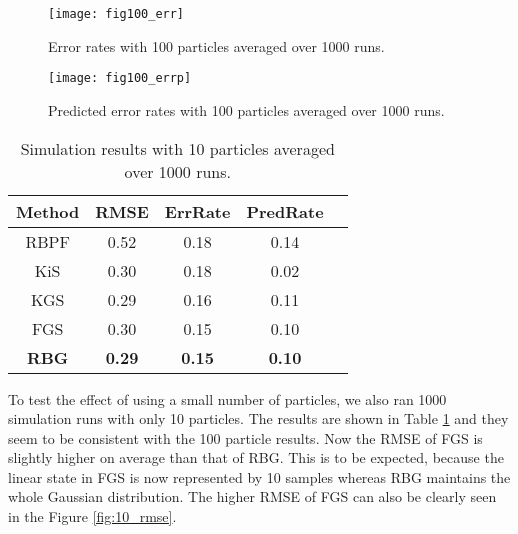 \documentclass[twocolumn]{autart}    %
\begin{document}
\begin{figure}[htb!]
\begin{center}
\texttt{[image: fig100\_err]}
\end{center}
\caption{Error rates with 100 particles averaged over 1000 runs.}
\label{fig:100_err}
\end{figure}

\begin{figure}[htb!]
\begin{center}
\texttt{[image: fig100\_errp]}
\end{center}
\caption{Predicted error rates with 100 particles averaged over 1000
  runs.}
\label{fig:100_errp}
\end{figure}

%
\begin{table}[htb]
\begin{center}
\begin{tabular}{|c|c|c|c|c|}
\hline
Method & RMSE              & ErrRate       &   PredRate \\
\hline
\hline
RBPF   & 0.52 & 0.18 & 0.14 \\ \hline
KiS    & 0.30 & 0.18 & 0.02 \\ \hline
KGS    & 0.29 & 0.16 & 0.11 \\ \hline
FGS    & 0.30 & 0.15 & 0.10 \\ \hline
{\bf RBG} & {\bf 0.29} & {\bf 0.15} & {\bf 0.10} \\ \hline
\end{tabular}
\end{center}
\caption{Simulation results with 10 particles averaged over 1000 runs. }
\label{tbl:res10}
\end{table}

To test the effect of using a small number of particles, we also ran
1000 simulation runs with only 10 particles. The results are shown in
Table \ref{tbl:res10} and they seem to be consistent with the 100
particle results. Now the RMSE of FGS is slightly higher on average
than that of RBG. This is to be expected, because the linear state in
FGS is now represented by 10 samples whereas RBG maintains the whole
Gaussian distribution. The higher RMSE of FGS can also be clearly seen
in the Figure \ref{fig:10_rmse}.
\end{document}
